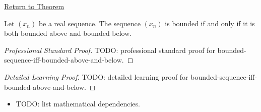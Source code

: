 \newpage
{}
\label{prf:bounded-sequence-iff-bounded-above-and-below}

\begin{remark*}[Return]
\hyperref[thm:bounded-sequence-iff-bounded-above-and-below]{Return to Theorem}
\end{remark*}

\begin{theorem*}
Let $(x_n)$ be a real sequence. The sequence $(x_n)$ is bounded if and only
if it is both bounded above and bounded below.

\smallskip
\noindent
\end{theorem*}

\begin{proof}[Professional Standard Proof]
\LRAProofBodyStart
TODO: professional standard proof for bounded-sequence-iff-bounded-above-and-below.
\end{proof}

\begin{proof}[Detailed Learning Proof]
\LRAProofBodyStart
TODO: detailed learning proof for bounded-sequence-iff-bounded-above-and-below.
\end{proof}

\begin{remark*}
\end{remark*}

\begin{dependencies}
\begin{itemize}
  \item TODO: list mathematical dependencies.
\end{itemize}
\end{dependencies}

\clearpage
